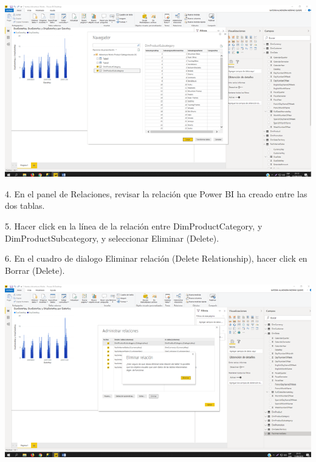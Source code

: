\begin{center}
\includegraphics[width=15cm]{./Imagenes/img19} 
\end{center}

\item 4. En el panel de Relaciones, revisar la relación que Power BI ha creado entre las dos tablas.
\item 5. Hacer click en la línea de la relación entre DimProductCategory, y DimProductSubcategory, y seleccionar Eliminar (Delete).
\item 6. En el cuadro de dialogo Eliminar relación (Delete Relationship), hacer click en Borrar (Delete).

\begin{center}
\includegraphics[width=15cm]{./Imagenes/img20} 
\end{center}

